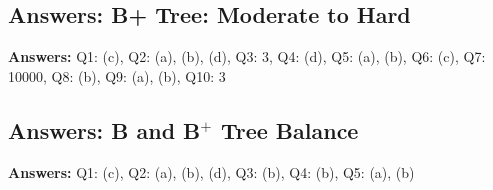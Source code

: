 \subsection*{Answers: B+ Tree: Moderate to Hard}
\noindent\textbf{Answers:}  
Q1: (c), Q2: (a), (b), (d), Q3: 3, Q4: (d), Q5: (a), (b), Q6: (c), Q7: 10000, Q8: (b), Q9: (a), (b),  Q10: 3

\subsection*{Answers: B and B$^+$ Tree Balance}
\noindent\textbf{Answers:}  
Q1: (c), Q2: (a), (b), (d), Q3: (b), Q4: (b), Q5: (a), (b)